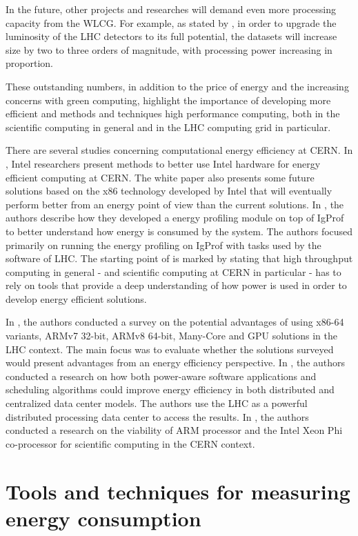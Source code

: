 In the future, other projects and researches will demand even more processing capacity from
the WLCG. For example, as stated by \cite{ACAT13ARM}, in order to upgrade the
luminosity of the LHC detectors to its full potential, the datasets will
increase size by two to three orders of magnitude, with processing power
increasing in proportion.

These outstanding numbers, in addition to the price of energy and the increasing
concerns with green computing, highlight the importance of
developing more efficient and methods and techniques high performance computing,
both in the scientific computing in general and in the LHC computing grid in
particular. 

There are several studies concerning computational energy efficiency at CERN. In \cite{INTEL_WP}, Intel researchers present methods to better use Intel hardware for energy efficient computing at CERN. The white paper also presents some future solutions based on the x86 technology developed by Intel that will eventually perform better from an energy point of view than the current solutions. In \cite{IGPROF}, the authors describe how they developed a energy profiling module on top of IgProf to better understand how energy is consumed by the system. The authors focused primarily on running the energy profiling on IgProf with tasks used by the software of LHC. The starting point of \cite{IGPROF} is marked by stating that high throughput computing in general - and scientific computing at CERN in particular - has to rely on tools that provide a deep understanding of how power is used in order to develop energy efficient solutions.

In \cite{FUTURE_CERN}, the authors conducted a survey on the potential advantages of using x86-64 variants, ARMv7 32-bit, ARMv8 64-bit, Many-Core and GPU solutions in the LHC context. The main focus was to evaluate whether the solutions surveyed would present advantages from an energy efficiency perspective. In \cite{POWER_AWAR_CERN}, the authors conducted a research on how both power-aware software applications and scheduling algorithms could improve energy efficiency in both distributed and centralized data center models. The authors use the LHC as a powerful distributed processing data center to access the results. In \cite{EXPLORATIONS_CERN}, the authors conducted a research on the viability of ARM processor and the Intel Xeon Phi co-processor for scientific computing in the CERN context.

\section{Tools and techniques for measuring energy consumption} %

